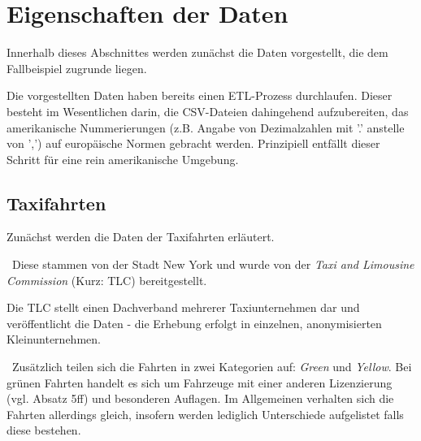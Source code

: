 \section{Eigenschaften der Daten}
\label{sec:Daten}
Innerhalb dieses Abschnittes werden zunächst die Daten vorgestellt, die dem Fallbeispiel zugrunde liegen. 

Die vorgestellten Daten haben bereits einen ETL-Prozess durchlaufen. Dieser besteht im Wesentlichen darin, die CSV-Dateien dahingehend aufzubereiten, das amerikanische Nummerierungen (z.B. Angabe von Dezimalzahlen mit '.' anstelle von ',') auf europäische Normen gebracht werden. Prinzipiell entfällt dieser Schritt für eine rein amerikanische Umgebung. 
\subsection{Taxifahrten}
\label{subsec:Taxidaten}
Zunächst werden die Daten der Taxifahrten erläutert. 

~\newline Diese stammen von der Stadt New York \cite{SourceTaxi} und wurde von der \textit{Taxi and Limousine Commission} (Kurz: TLC) bereitgestellt. 

Die TLC stellt einen Dachverband mehrerer Taxiunternehmen dar und veröffentlicht die Daten - die Erhebung erfolgt in einzelnen, anonymisierten Kleinunternehmen. 

~\newline Zusätzlich teilen sich die Fahrten in zwei Kategorien auf: \textit{Green} und \textit{Yellow}. Bei grünen Fahrten handelt es sich um Fahrzeuge mit einer anderen Lizenzierung (vgl. \cite{GreenTaxis} Absatz 5ff) und besonderen Auflagen. Im Allgemeinen verhalten sich die Fahrten allerdings gleich, insofern werden lediglich Unterschiede aufgelistet falls diese bestehen.
